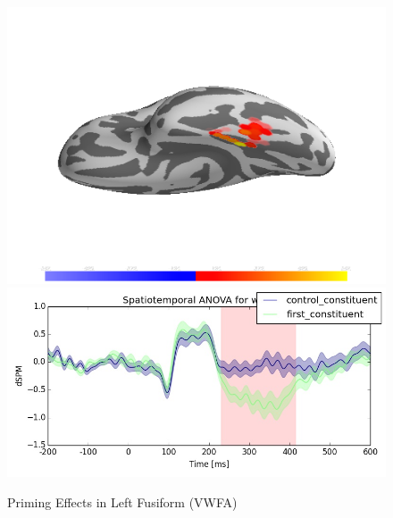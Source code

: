 \documentclass{frontiersSCNS}
\begin{document}
\begin{figure}
\begin{centering}
\includegraphics[scale=0.33]{images/target_brain_condition_analysis}\includegraphics[scale=0.33]{images/target_anova_condition_analysis}
\par\end{centering}
\caption{\label{fig:morph_decomp} Priming Effects in Left Fusiform (VWFA)}
\end{figure}
\end{document}
